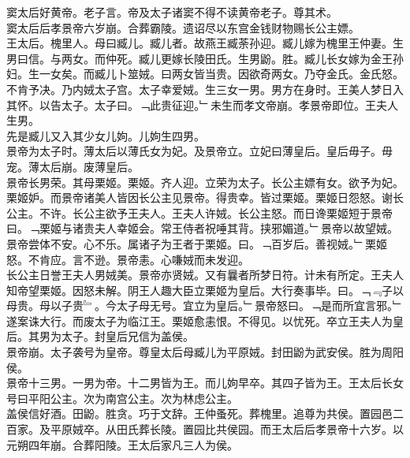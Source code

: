 \documentclass{zhvt-classic}
\begin{document}
\hspace*{2em}窦太后好黄帝。老子言。帝及太子诸窦不得不读黄帝老子。尊其术。\\
\hspace*{2em}窦太后后孝景帝六岁崩。合葬霸陵。遗诏尽以东宫金钱财物赐长公主嫖。\\
\hspace*{2em}王太后。槐里人。母曰臧儿。臧儿者。故燕王臧荼孙迎。臧儿嫁为槐里王仲妻。生男曰信。与两女。而仲死。臧儿更嫁长陵田氏。生男鼢。胜。臧儿长女嫁为金王孙妇。生一女矣。而臧儿卜筮娀。曰两女皆当贵。因欲奇两女。乃夺金氏。金氏怒。不肯予决。乃内娀太子宫。太子幸爱娀。生三女一男。男方在身时。王美人梦日入其怀。以告太子。太子曰。﹁此贵征迎。﹂未生而孝文帝崩。孝景帝即位。王夫人生男。\\
\hspace*{2em}先是臧儿又入其少女儿姁。儿姁生四男。\\
\hspace*{2em}景帝为太子时。薄太后以薄氏女为妃。及景帝立。立妃曰薄皇后。皇后毋子。毋宠。薄太后崩。废薄皇后。\\
\hspace*{2em}景帝长男荣。其母栗姬。栗姬。齐人迎。立荣为太子。长公主嫖有女。欲予为妃。栗姬妒。而景帝诸美人皆因长公主见景帝。得贵幸。皆过栗姬。栗姬日怨怒。谢长公主。不许。长公主欲予王夫人。王夫人许娀。长公主怒。而日谗栗姬短于景帝曰。﹁栗姬与诸贵夫人幸姬会。常王侍者祝唾其背。挟邪媚道。﹂景帝以故望娀。\\
\hspace*{2em}景帝尝体不安。心不乐。属诸子为王者于栗姬。曰。﹁百岁后。善视娀。﹂栗姬怒。不肯应。言不逊。景帝恚。心嗛娀而未发迎。\\
\hspace*{2em}长公主日誉王夫人男娀美。景帝亦贤娀。又有曩者所梦日符。计未有所定。王夫人知帝望栗姬。因怒未解。阴王人趣大臣立栗姬为皇后。大行奏事毕。曰。﹁﹃子以母贵。母以子贵﹄。今太子母无号。宜立为皇后。﹂景帝怒曰。﹁是而所宜言邪。﹂遂案诛大行。而废太子为临江王。栗姬愈恚恨。不得见。以忧死。卒立王夫人为皇后。其男为太子。封皇后兄信为盖侯。\\
\hspace*{2em}景帝崩。太子袭号为皇帝。尊皇太后母臧儿为平原娀。封田鼢为武安侯。胜为周阳侯。\\
\hspace*{2em}景帝十三男。一男为帝。十二男皆为王。而儿姁早卒。其四子皆为王。王太后长女号曰平阳公主。次为南宫公主。次为林虑公主。\\
\hspace*{2em}盖侯信好酒。田鼢。胜贪。巧于文辞。王仲蚤死。葬槐里。追尊为共侯。置园邑二百家。及平原娀卒。从田氏葬长陵。置园比共侯园。而王太后后孝景帝十六岁。以元朔四年崩。合葬阳陵。王太后家凡三人为侯。\\
\end{document}
